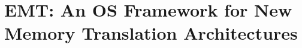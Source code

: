 \section{EMT: An OS Framework for New Memory Translation Architectures}
\label{chp:emt}

\graphicspath{{emt/}}















